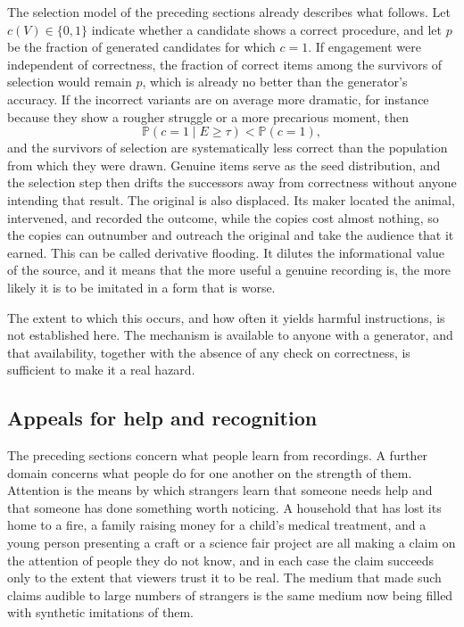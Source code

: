 \documentclass[12pt]{article}
\theoremstyle{plain}
\theoremstyle{definition}
\theoremstyle{remark}
\renewcommand{\Pr}{\mathbb{P}}
\begin{document}
The selection model of the preceding sections already describes what follows. Let $c(V) \in \{0,1\}$ indicate whether a candidate shows a correct procedure, and let $p$ be the fraction of generated candidates for which $c = 1$. If engagement were independent of correctness, the fraction of correct items among the survivors of selection would remain $p$, which is already no better than the generator's accuracy. If the incorrect variants are on average more dramatic, for instance because they show a rougher struggle or a more precarious moment, then
\[
\Pr(c = 1 \mid E \ge \tau) < \Pr(c = 1),
\]
and the survivors of selection are systematically less correct than the population from which they were drawn. Genuine items serve as the seed distribution, and the selection step then drifts the successors away from correctness without anyone intending that result. The original is also displaced. Its maker located the animal, intervened, and recorded the outcome, while the copies cost almost nothing, so the copies can outnumber and outreach the original and take the audience that it earned. This can be called derivative flooding. It dilutes the informational value of the source, and it means that the more useful a genuine recording is, the more likely it is to be imitated in a form that is worse.

The extent to which this occurs, and how often it yields harmful instructions, is not established here. The mechanism is available to anyone with a generator, and that availability, together with the absence of any check on correctness, is sufficient to make it a real hazard.

\subsection{Appeals for help and recognition}

The preceding sections concern what people learn from recordings. A further domain concerns what people do for one another on the strength of them. Attention is the means by which strangers learn that someone needs help and that someone has done something worth noticing. A household that has lost its home to a fire, a family raising money for a child's medical treatment, and a young person presenting a craft or a science fair project are all making a claim on the attention of people they do not know, and in each case the claim succeeds only to the extent that viewers trust it to be real. The medium that made such claims audible to large numbers of strangers is the same medium now being filled with synthetic imitations of them.
\end{document}
